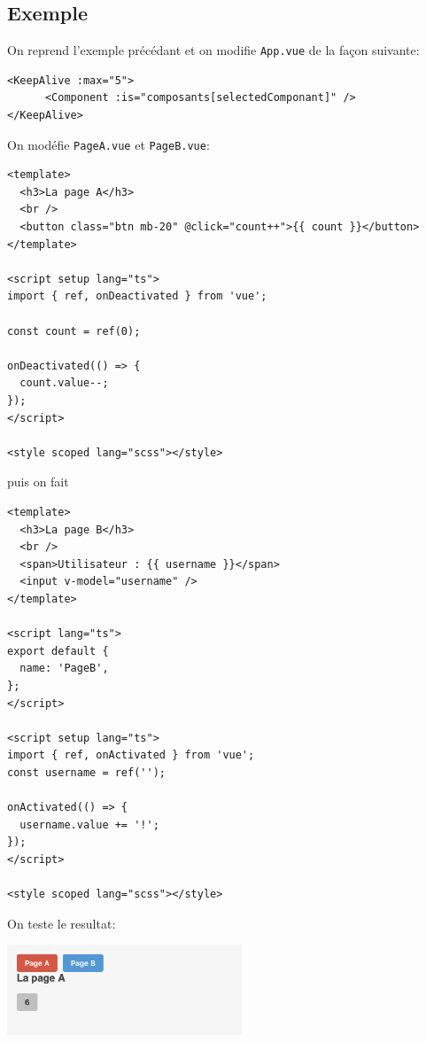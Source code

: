\subsection{Exemple}
On reprend l'exemple précédant et on modifie {\tt App.vue} de la façon suivante:
\begin{verbatim}
<KeepAlive :max="5">
      <Component :is="composants[selectedComponant]" />
</KeepAlive>
\end{verbatim}
On modéfie {\tt PageA.vue} et {\tt PageB.vue}:
\begin{verbatim}
<template>
  <h3>La page A</h3>
  <br />
  <button class="btn mb-20" @click="count++">{{ count }}</button>
</template>

<script setup lang="ts">
import { ref, onDeactivated } from 'vue';

const count = ref(0);

onDeactivated(() => {
  count.value--;
});
</script>

<style scoped lang="scss"></style>
\end{verbatim}
puis on fait
\begin{verbatim}
<template>
  <h3>La page B</h3>
  <br />
  <span>Utilisateur : {{ username }}</span>
  <input v-model="username" />
</template>

<script lang="ts">
export default {
  name: 'PageB',
};
</script>

<script setup lang="ts">
import { ref, onActivated } from 'vue';
const username = ref('');

onActivated(() => {
  username.value += '!';
});
</script>

<style scoped lang="scss"></style>
\end{verbatim}
On teste le resultat:
\begin{center}
\includegraphics[width=7cm]{images/image30.png}
\end{center}




